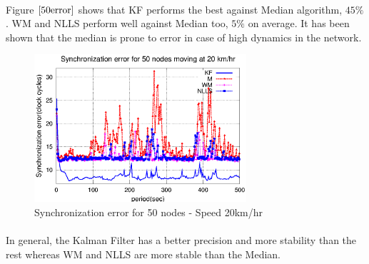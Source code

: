 \documentclass[a4paper,10pt]{report}
\begin{document}
\paragraph*{}
Figure $\ref{50error}$ shows that KF performs the best against Median algorithm, $45\%$. WM and NLLS perform well against Median too, $5\%$ on average. It has been shown that the median is prone to error in case of high dynamics in the network.
\begin{figure}
\centering
\includegraphics[width=0.7\textwidth]{50output-s20}
\caption{Synchronization error for 50 nodes - Speed 20km/hr} \label{50output20}
\end{figure}
\paragraph*{}
In general, the Kalman Filter has a better precision and more stability than the rest whereas WM and NLLS are more stable than the Median.
\end{document}
